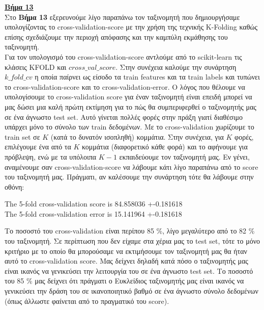 \documentclass[11pt]{article} %
\begin{document}
\underline{\textbf{Βήμα 13}}\\

Στο \textbf{Βήμα 13} εξερευνούμε λίγο παραπάνω τον ταξινομητή που δημιουργήσαμε υπολογίζοντας το cross-validation-score με την χρήση της τεχνικής K-Folding καθώς επίσης σχεδιάζουμε την περιοχή απόφασης και την καμπύλη εκμάθησης του ταξινομητή.\\

Για τον υπολογισμό του cross-validation-score αντλούμε από το scikit-learn τις κλάσεις ΚFOLD και $cross\_val\_score$. Στην συνέχεια καλούμε την συνάρτηση $k\_fold\_cv$ η οποία παίρνει ως είσοδο τα train features και τα train labels και τυπώνει το cross-validation-score και το cross-validation-error. Ο λόγος που θέλουμε να υπολογίσουμε το cross-validation score για έναν ταξινομητή είναι επειδή μπορεί να μας δώσει μια καλή πρώτη εκτίμηση για το πώς θα συμπεριφερθεί ο ταξινομητής μας σε ένα άγνωστο test set. Αυτό γίνεται πολλές φορές στην πράξη γιατί διαθέσιμο υπάρχει μόνο το σύνολο των train δεδομένων. Με το cross-validation χωρίζουμε το train set σε $Κ$  (κατά το δυνατόν ισοπληθή) κομμάτια. Στην συνέχεια, για $Κ$ φορές, επιλέγουμε ένα από τα $Κ$ κομμάτια (διαφορετικό κάθε φορά) και το αφήνουμε για πρόβλεψη, ενώ με τα υπόλοιπα $K - 1$ εκπαιδεύουμε τον ταξινομητή μας. Εν γένει, αναμένουμε σαν cross-validation-score να λάβουμε κάτι λίγο παραπάνω από το score του ταξινομητή μας. Πράγματι, αν καλέσουμε την συνάρτηση τότε θα λάβουμε στην οθόνη:
\begin{center}
The 5-fold cross-validation score is 84.858036 +-0.181618\\
The 5-fold cross-validation error is 15.141964 +-0.181618
\end{center}

Το ποσοστό του cross-validation είναι περίπου 85 \%, λίγο μεγαλύτερο από το 82 \% του ταξινομητή. Σε περίπτωση που δεν είχαμε στα χέρια μας το test set, τότε το μόνο κριτήριο με το οποίο θα μπορούσαμε να εκτιμήσουμε τον ταξινομητή μας θα ήταν αυτό το cross-validation score. Μας δείχνει δηλαδή κατά πόσο ο ταξινομητής μας είναι ικανός να γενικεύσει την λειτουργία του σε ένα άγνωστο test set. Το ποσοστό του 85 \% μας δείχνει ότι πράγματι ο Ευκλείδιος ταξινομητής μας είναι ικανός να γενικεύσει την δράση του σε ικανοποιητικό βαθμό σε ένα άγνωστο σύνολο δεδομένων (όπως άλλωστε φαίνεται από το πραγματικό του score).\\
\end{document}
